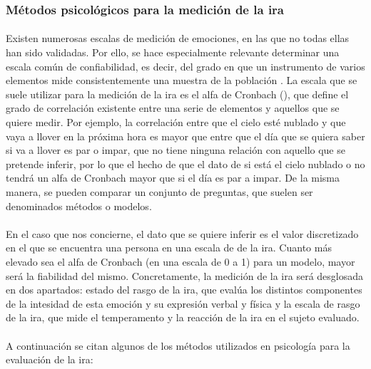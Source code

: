 
\subsubsection{Métodos psicológicos para la medición de la ira}
\label{subsubsec:medicionIra1}

\paragraph{}
Existen numerosas escalas de medición de emociones, en las que no todas ellas han sido validadas. Por ello, se hace especialmente relevante determinar una escala común de confiabilidad, es decir, del grado en que un instrumento de varios elementos mide consistentemente una muestra de la población \citep{celina2005aproximacion}. La escala que se suele utilizar para la medición de la ira es el alfa de Cronbach (\citeyear{cronbach1951coefficient}), que define el grado de correlación existente entre una serie de elementos y aquellos que se quiere medir. Por ejemplo, la correlación entre que el cielo esté nublado y que vaya a llover en la próxima hora es mayor que entre que el día que se quiera saber si va a llover es par o impar, que no tiene ninguna relación con aquello que se pretende inferir, por lo que el hecho de que el dato de si está el cielo nublado o no tendrá un alfa de Cronbach mayor que si el día es par a impar. De la misma manera, se pueden comparar un conjunto de preguntas, que suelen ser denominados métodos o modelos.

\paragraph{}
En el caso que nos concierne, el dato que se quiere inferir es el valor discretizado en el que se encuentra una persona en una escala de de la ira. Cuanto más elevado sea el alfa de Cronbach (en una escala de 0 a 1) para un modelo, mayor será la fiabilidad del mismo. Concretamente, la medición de la ira será desglosada en dos apartados: estado del rasgo de la ira, que evalúa los distintos componentes de la intesidad de esta emoción y su expresión verbal y física y la escala de rasgo de la ira, que mide el temperamento y la reacción de la ira en el sujeto evaluado. 

\paragraph{}
A continuación se citan algunos de los métodos utilizados en psicología para la evaluación de la ira:

